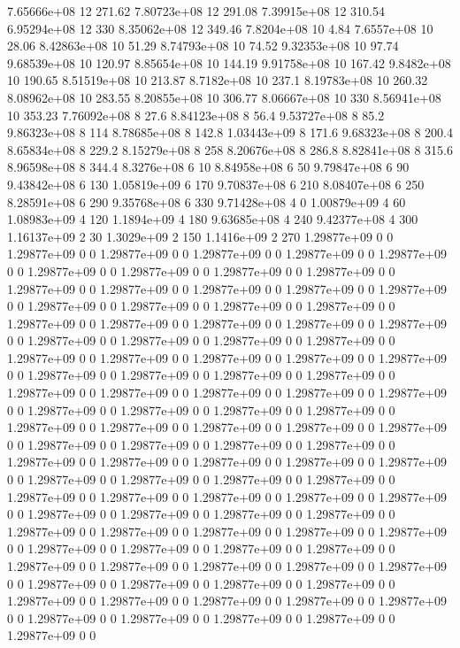 7.65666e+08 12 271.62
7.80723e+08 12 291.08
7.39915e+08 12 310.54
6.95294e+08 12 330
8.35062e+08 12 349.46
7.8204e+08 10 4.84
7.6557e+08 10 28.06
8.42863e+08 10 51.29
8.74793e+08 10 74.52
9.32353e+08 10 97.74
9.68539e+08 10 120.97
8.85654e+08 10 144.19
9.91758e+08 10 167.42
9.8482e+08 10 190.65
8.51519e+08 10 213.87
8.7182e+08 10 237.1
8.19783e+08 10 260.32
8.08962e+08 10 283.55
8.20855e+08 10 306.77
8.06667e+08 10 330
8.56941e+08 10 353.23
7.76092e+08 8 27.6
8.84123e+08 8 56.4
9.53727e+08 8 85.2
9.86323e+08 8 114
8.78685e+08 8 142.8
1.03443e+09 8 171.6
9.68323e+08 8 200.4
8.65834e+08 8 229.2
8.15279e+08 8 258
8.20676e+08 8 286.8
8.82841e+08 8 315.6
8.96598e+08 8 344.4
8.3276e+08 6 10
8.84958e+08 6 50
9.79847e+08 6 90
9.43842e+08 6 130
1.05819e+09 6 170
9.70837e+08 6 210
8.08407e+08 6 250
8.28591e+08 6 290
9.35768e+08 6 330
9.71428e+08 4 0
1.00879e+09 4 60
1.08983e+09 4 120
1.1894e+09 4 180
9.63685e+08 4 240
9.42377e+08 4 300
1.16137e+09 2 30
1.3029e+09 2 150
1.1416e+09 2 270
1.29877e+09 0 0
1.29877e+09 0 0
1.29877e+09 0 0
1.29877e+09 0 0
1.29877e+09 0 0
1.29877e+09 0 0
1.29877e+09 0 0
1.29877e+09 0 0
1.29877e+09 0 0
1.29877e+09 0 0
1.29877e+09 0 0
1.29877e+09 0 0
1.29877e+09 0 0
1.29877e+09 0 0
1.29877e+09 0 0
1.29877e+09 0 0
1.29877e+09 0 0
1.29877e+09 0 0
1.29877e+09 0 0
1.29877e+09 0 0
1.29877e+09 0 0
1.29877e+09 0 0
1.29877e+09 0 0
1.29877e+09 0 0
1.29877e+09 0 0
1.29877e+09 0 0
1.29877e+09 0 0
1.29877e+09 0 0
1.29877e+09 0 0
1.29877e+09 0 0
1.29877e+09 0 0
1.29877e+09 0 0
1.29877e+09 0 0
1.29877e+09 0 0
1.29877e+09 0 0
1.29877e+09 0 0
1.29877e+09 0 0
1.29877e+09 0 0
1.29877e+09 0 0
1.29877e+09 0 0
1.29877e+09 0 0
1.29877e+09 0 0
1.29877e+09 0 0
1.29877e+09 0 0
1.29877e+09 0 0
1.29877e+09 0 0
1.29877e+09 0 0
1.29877e+09 0 0
1.29877e+09 0 0
1.29877e+09 0 0
1.29877e+09 0 0
1.29877e+09 0 0
1.29877e+09 0 0
1.29877e+09 0 0
1.29877e+09 0 0
1.29877e+09 0 0
1.29877e+09 0 0
1.29877e+09 0 0
1.29877e+09 0 0
1.29877e+09 0 0
1.29877e+09 0 0
1.29877e+09 0 0
1.29877e+09 0 0
1.29877e+09 0 0
1.29877e+09 0 0
1.29877e+09 0 0
1.29877e+09 0 0
1.29877e+09 0 0
1.29877e+09 0 0
1.29877e+09 0 0
1.29877e+09 0 0
1.29877e+09 0 0
1.29877e+09 0 0
1.29877e+09 0 0
1.29877e+09 0 0
1.29877e+09 0 0
1.29877e+09 0 0
1.29877e+09 0 0
1.29877e+09 0 0
1.29877e+09 0 0
1.29877e+09 0 0
1.29877e+09 0 0
1.29877e+09 0 0
1.29877e+09 0 0
1.29877e+09 0 0
1.29877e+09 0 0
1.29877e+09 0 0
1.29877e+09 0 0
1.29877e+09 0 0
1.29877e+09 0 0
1.29877e+09 0 0
1.29877e+09 0 0
1.29877e+09 0 0
1.29877e+09 0 0
1.29877e+09 0 0
1.29877e+09 0 0
1.29877e+09 0 0
1.29877e+09 0 0
1.29877e+09 0 0
1.29877e+09 0 0
1.29877e+09 0 0
